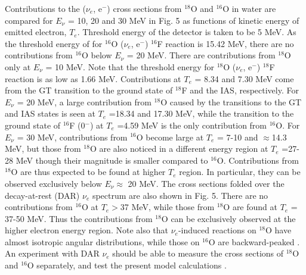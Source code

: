\documentclass[preprint,12pt]{elsarticle}
\begin{document}
Contributions to the ($\nu_e$, e$^{-}$) cross sections from $^{18}$O and $^{16}$O in water are compared for $E_{\nu}$ = 10, 20 and 30 MeV in Fig. 5 as functions of kinetic energy of emitted electron, $T_e$.
Threshold energy of the detector is taken to be 5 MeV.
As the threshold energy of for $^{16}$O ($\nu_e$, e$^{-}$) $^{16}$F reaction is 15.42 MeV, there are no contributions from $^{16}$O below $E_{\nu}$ = 20 MeV.
There are contributions from $^{18}$O only at $E_{\nu}$ = 10 MeV.
Note that the threshold energy for $^{18}$O ($\nu_e$, e$^{-}$) $^{18}$F reaction is as low as 1.66 MeV. 
Contributions at $T_e$ = 8.34 and 7.30 MeV come from the GT transition to the ground state of $^{18}$F and the IAS, respectively. 
For $E_{\nu}$ = 20 MeV, a large contribution from $^{18}$O caused by the transitions to the GT and IAS states is seen at $T_e$ =18.34 and 17.30 MeV, while the transition to the ground state of $^{16}$F (0$^{-}$) at $T_e$ =4.59 MeV is the only contribution from $^{16}$O.  
For $E_{\nu}$ = 30 MeV, contributions from $^{16}$O become large at $T_e$ = 7-10 and $\approx$14.3 MeV, but those from $^{18}$O are also noticed in a different energy region at $T_e$ =27-28 MeV though their magnitude is smaller compared to $^{16}$O.
Contributions from $^{18}$O are thus expected to be found at higher $T_e$ region.
In particular, they can be observed exclusively below $E_{\nu}\approx$ 20 MeV. 
The cross sections folded over the decay-at-rest (DAR) $\nu_e$ spectrum are also shown in Fig. 5.
There are no contributions from $^{16}$O at $T_e >$37 MeV, while those from $^{18}$O are found at $T_e$ = 37-50 MeV. 
Thus the contributions from $^{18}$O can be  exclusively observed at the higher electron energy region.  
Note also that $\nu_e$-induced reactions on $^{18}$O have almost isotropic angular distributions, while those on $^{16}$O are backward-peaked \cite{Haxton}.  
An experiment with DAR $\nu_e$ should be able to measure the cross sections of $^{18}$O and $^{16}$O separately, and test the present model calculations \cite{COHERENT}.  
\end{document}

